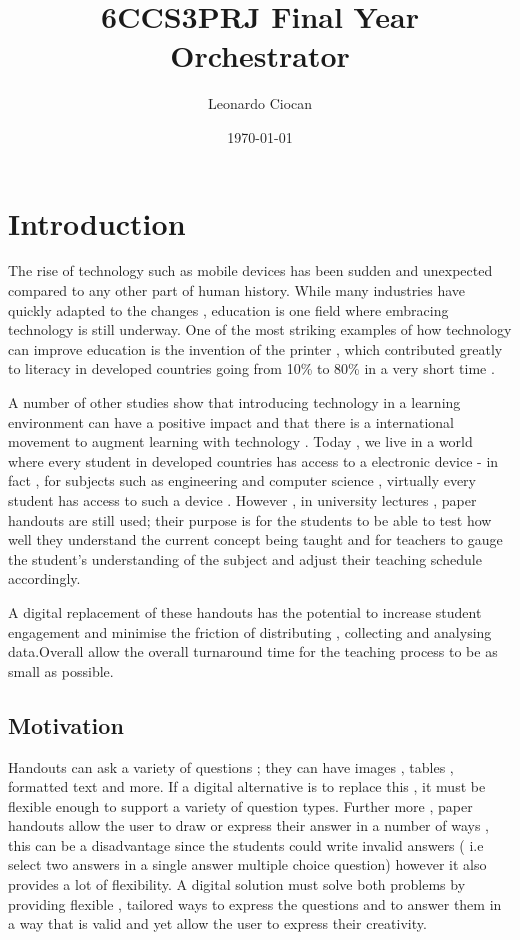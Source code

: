 \documentclass[11pt]{informatics-report}
\title{6CCS3PRJ Final Year\\\vspace{0.2cm}Orchestrator}
\author{Leonardo Ciocan}
\date{\today}
\begin{document}
\createFrontMatter
\doublespacing
\tableofcontents
\doublespacing


\chapter{Introduction}
The rise of technology such as mobile devices has been sudden and unexpected compared to any other part of human history. While many industries have quickly adapted to the changes , education is one field where embracing technology is still underway. One of the most striking examples of how technology can improve education is the invention of the printer , which contributed greatly to literacy in developed countries going from 10\% to 80\% in a very short time \cite{printing}.

A number of other studies show that introducing technology in a learning environment can have a positive impact \cite{tech} and that there is a international movement to augment learning with technology \cite{tech2}.
Today , we live in a world where every student in developed countries has access to a electronic device - in fact , for subjects such as engineering and computer science , virtually every student has access to such a device \cite{laptop1} \cite{laptop2} . However , in university lectures , paper handouts are still used; their purpose is for the students to be able to test how well they understand the current concept being taught and for teachers to gauge the student's understanding of the subject and adjust their teaching schedule accordingly.

A digital replacement of these handouts has the potential to increase student engagement and minimise the friction of distributing , collecting and analysing data.Overall allow the overall turnaround time for the teaching process to be as small as possible.

\section{Motivation}
Handouts can ask a variety of questions ; they can have images , tables , formatted text and more. If a digital alternative is to replace this , it must be flexible enough to support a variety of question types. Further more , paper handouts allow the user to draw or express their answer in a number of ways  , this can be a disadvantage since the students could write invalid answers ( i.e select two answers in a single answer multiple choice question) however it also provides a lot of flexibility. A digital solution must solve both problems by providing flexible , tailored ways to express the questions and to answer them in a way that is valid and yet allow the user to express their creativity.
\end{document}
